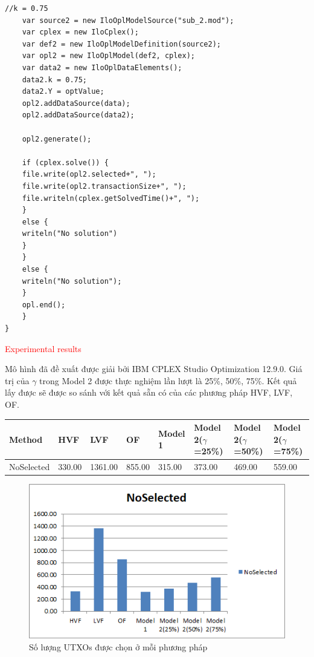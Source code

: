\documentclass[a4paper]{article}
\begin{document}
\begin{lstlisting}[frame=single]
	//k = 0.75
	var source2 = new IloOplModelSource("sub_2.mod");
	var cplex = new IloCplex();
	var def2 = new IloOplModelDefinition(source2);
	var opl2 = new IloOplModel(def2, cplex);
	var data2 = new IloOplDataElements();
	data2.k = 0.75;
	data2.Y = optValue;
	opl2.addDataSource(data);
	opl2.addDataSource(data2);
	
	opl2.generate();
	
	if (cplex.solve()) {
	file.write(opl2.selected+", ");
	file.write(opl2.transactionSize+", ");
	file.writeln(cplex.getSolvedTime()+", ");
	}
	else {
	writeln("No solution") 			
	}
	}	
	else {
	writeln("No solution"); 		
	}
	opl.end();
	} 
}
\end{lstlisting}



\textcolor{red}{Experimental results}

Mô hình đã đề xuất được giải bởi IBM CPLEX Studio Optimization 12.9.0. Giá trị của $\gamma$ trong Model 2 được thực nghiệm lần lượt là 25\%, 50\%, 75\%. Kết quả lấy được sẽ được so sánh với kết quả sẵn có của các phương pháp HVF, LVF, OF.

\begin{table}[ht]
	\begin{tabular}{|l|l|l|l|l|l|l|l|}
		\hline
		Method     & HVF    & LVF     & OF     & Model 1 & Model 2($\gamma$=25\%) & Model 2($\gamma$=50\%) & Model 2($\gamma$=75\%) \\ \hline
		NoSelected & 330.00 & 1361.00 & 855.00 & 315.00  & 373.00        & 469.00        & 559.00        \\ \hline
	\end{tabular}
\end{table}

\begin{center}
	\begin{figure} [ht]
		\begin{center}
			\includegraphics[scale=1]{NoSelected}
		\end{center}
		\caption{Số lượng UTXOs được chọn ở mỗi phương pháp}
		\label{refhinh1}
	\end{figure}
\end{center}
\end{document}
